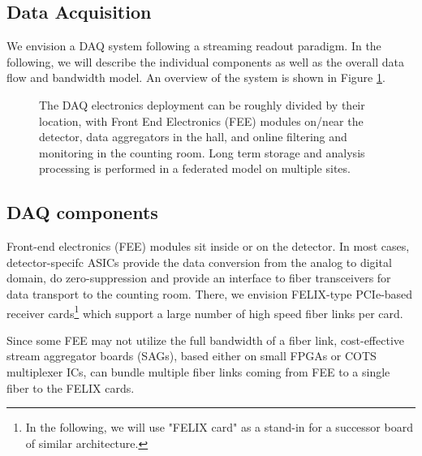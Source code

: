 \subsection{Data Acquisition}

We envision a DAQ system following a streaming readout paradigm. In the following, we will describe the individual components as well as the overall data flow and bandwidth model. An overview of the system is shown in Figure \ref{fig:data_acquisition_diagram}.


\begin{figure}[hbt!]
 \begin{center}
  
  
  \caption[Data Acquisition Diagram]{\label{fig:data_acquisition_diagram} The DAQ electronics deployment can be roughly divided by their location, with Front End Electronics (FEE) modules on/near the detector, data aggregators in the hall, and online filtering and monitoring in the counting room. Long term storage and analysis processing is performed in a federated model on multiple sites. }
 \end{center}
\end{figure}


\subsection{DAQ components}
 Front-end electronics (FEE) modules sit inside or on the detector. In most cases, detector-specifc ASICs provide the data conversion from the analog to digital domain, do zero-suppression and provide an interface to fiber transceivers for data transport to the counting room.  There, we envision FELIX-type PCIe-based receiver cards\footnote{In the following, we will use "FELIX card" as a stand-in for a successor board of similar architecture.} which support a large number of high speed fiber links per card.  

Since some FEE may not utilize the full bandwidth of a fiber link, cost-effective stream aggregator boards (SAGs), based either on small FPGAs or COTS multiplexer ICs, can bundle multiple fiber links coming from FEE to a single fiber to the FELIX cards. 

